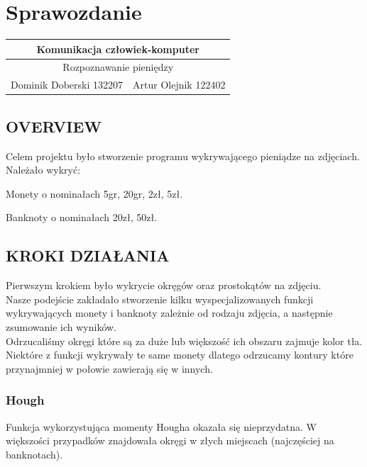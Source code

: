 \documentclass[12pt]{article}
\begin{document}
\section*{Sprawozdanie}

\begin{center}
\begin{table}[]
\begin{tabular}{|c|l|}
\hline
\multicolumn{2}{|c|}{Komunikacja człowiek-komputer}                  \\ \hline
\multicolumn{2}{|c|}{Rozpoznawanie pieniędzy}                        \\ \hline
\multicolumn{1}{|l|}{Dominik Doberski 132207} & Artur Olejnik 122402 \\ \hline
\end{tabular}
\end{table}
\end{center}

\subsection*{OVERVIEW}

Celem projektu było stworzenie programu wykrywającego pieniądze na zdjęciach.\\
Należało wykryć:

Monety o nominałach 5gr, 20gr, 2zł, 5zł.

Banknoty o nominałach 20zł, 50zł.
\newpage
\subsection*{KROKI DZIAŁANIA}
Pierwszym krokiem było wykrycie okręgów oraz prostokątów na zdjęciu.
\\Nasze podejście zakładało stworzenie kilku wyspecjalizowanych funkcji wykrywających monety i banknoty zależnie od rodzaju zdjęcia, a następnie zsumowanie ich wyników.\\
Odrzucaliśmy okręgi które są za duże lub większość ich obszaru zajmuje kolor tła.\\
Niektóre z funkcji wykrywały te same monety dlatego odrzucamy kontury które przynajmniej w połowie zawierają się w innych.
\subsubsection*{Hough}
Funkcja wykorzystująca momenty Hougha okazała się nieprzydatna.
W większości przypadków znajdowała okręgi w złych miejscach (najczęściej na banknotach).
\end{document}
